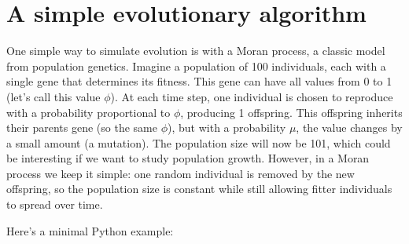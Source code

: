 \documentclass[
  letterpaper,
  DIV=11,
  numbers=noendperiod]{scrreprt}
\theoremstyle{definition}
\theoremstyle{remark}
\begin{document}
\section{A simple evolutionary
algorithm}\label{a-simple-evolutionary-algorithm}

One simple way to simulate evolution is with a Moran process, a classic
model from population genetics. Imagine a population of 100 individuals,
each with a single gene that determines its fitness. This gene can have
all values from 0 to 1 (let's call this value \(\phi\)). At each time
step, one individual is chosen to reproduce with a probability
proportional to \(\phi\), producing 1 offspring. This offspring inherits
their parents gene (so the same \(\phi\)), but with a probability
\(\mu\), the value changes by a small amount (a mutation). The
population size will now be 101, which could be interesting if we want
to study population growth. However, in a Moran process we keep it
simple: one random individual is removed by the new offspring, so the
population size is constant while still allowing fitter individuals to
spread over time.

Here's a minimal Python example:
\end{document}
